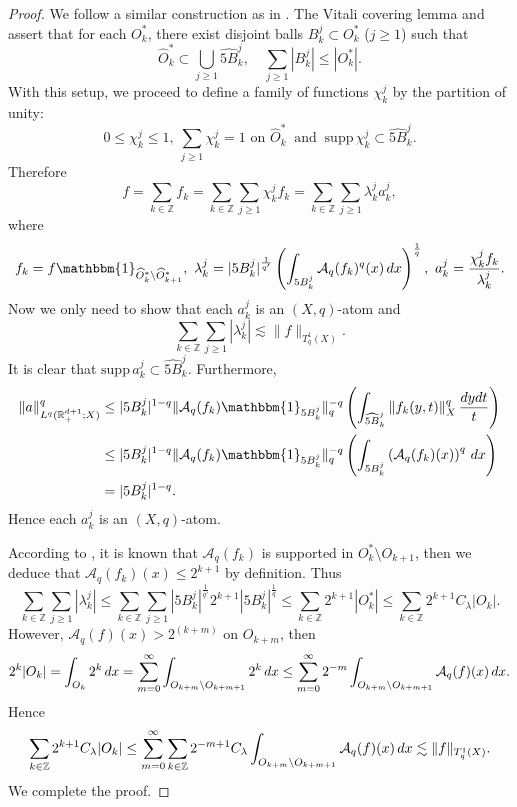 \documentclass[oneside,english,a4wide]{amsart}
\numberwithin{equation}{section}
\numberwithin{figure}{section}
\theoremstyle{plain}
\theoremstyle{plain}
\theoremstyle{definition}
\theoremstyle{plain}
\theoremstyle{remark}
\theoremstyle{definition}
\theoremstyle{remark}
\theoremstyle{definition}
\newcommand{\real}{{\mathbb R}}
\newcommand{\ent}{{\mathbb Z}}
\newcommand{\A}{{\mathcal A}}
\newcommand{\8}{+\infty}
\renewcommand{\1}{\mathbbm{1}}
\newcommand{\wh}{\widehat}
\newcommand\sk[1]{ \left( #1 \right) }
\newcommand\supp{\text{supp}}
\renewcommand\d{{\rm d}}
\begin{document}
{\begin{proof}
We follow a similar construction as in \cite{Kemppainen2014}. The {Vitali covering lemma} and \cite[Lemma 4.2]{Kemppainen2016} assert that for each $O_k^*$, there exist disjoint balls $B_k^j \subset O_k^*$ ($j \geq 1$) such that 
\[
    \wh{O}^*_k \subset \bigcup_{j \geq 1} \wh{5B}_k^j, \quad \sum_{j \geq 1}|B_k^j| \leq |O_k^*|.
\]
With this setup, we proceed to define a family of functions $\chi_k^j$ by the partition of unity:
\[
    0 \leq \chi_k^j \leq 1,\ \sum_{j \geq 1}\chi_k^j = 1 \text{ on } \wh{O}_k^* \ \text{ and } \ \supp\, \chi_k^j \subset \wh{5B}_k^j.
\]
Therefore 
\[
    f =\sum_{k \in \ent} f_k = \sum_{k\in \ent}\sum_{j \geq 1} \chi_{k}^jf_k = \sum_{k\in \ent}\sum_{j \geq 1} \lambda_k^j a_k^j,
\]
where
\begin{equation}\label{Def_f_k}
    f_k = f \1_{\wh{O}^*_k\setminus \wh{O}^*_{k+1} },\ \lambda_k^j = |5B_k^j|^{\frac{1}{q'}}\sk{ \int_{ 5B_k^j } \A_q(f_k)^q(x) \,\d x }^{\frac{1}{q}}, \ a_k^j = \frac{\chi_k^jf_k}{\lambda_k^j}.
\end{equation}
Now we only need to show that each $a_k^j$ is an $(X, q)$-atom and 
\[
    \sum_{k \in \ent} \sum_{j \geq 1}|\lambda_k^j| \lesssim \| f \|_{T^1_q(X)}.
\]
It is clear that $\supp\, a_k^j \subset \wh{5B}_{k}^j $. Furthermore,
\[
\begin{aligned}
    \| a \|_{L^q(\real^{d+1}_+; X)}^q & \leq |5B_k^j|^{1-q}\| \A_q(f_k)\1_{5B_k^j} \|_q^{-q} \sk{\int_{\wh{5B}_k^j} \| f_k(y, t) \|_X^q \,\frac{\d y\d t}{t} } \\ 
    & \leq |5B_k^j|^{1-q}\| \A_q(f_k)\1_{5B_k^j} \|_q^{-q} \sk{\int_{5B_k^j} \sk{\A_q(f_k)(x)}^q \,\d x }\\ & = |5B_k^j|^{1-q}.
\end{aligned}  
\]
Hence each $a_k^j$ is an $(X, q)$-atom. 

According to \cite[Lemma 5]{Coifman1985}, it is known that $\A_q(f_k)$ is supported in $O^*_k \setminus O_{k+1}$, then we deduce that $\A_q(f_k)(x) \leq 2^{k+1}$ by definition. Thus
\[
    \sum_{k \in\ent}\sum_{j \geq 1} |\lambda_k^j| \leq \sum_{k \in\ent}\sum_{j \geq 1} |5B_k^j|^{\frac{1}{q'}} 2^{k+1} |5B_k^j|^{\frac{1}{q}} \leq \sum_{k \in \ent} 2^{k + 1}|O_k^*| \leq \sum_{k \in \ent} 2^{k + 1}C_\lambda|O_k|.
\]
However, $\A_q(f)(x) > 2^{(k+m)}$ on $O_{k+m}$, then
\[
    2^{k}|O_k| = \int_{O_k}2^{k} \,\d x = \sum_{m = 0}^{\infty} \int_{O_{k+m}\setminus O_{k+m+1}} 2^{k}\,\d x \leq \sum_{m = 0}^{\infty} 2^{-m}\int_{O_{k+m}\setminus O_{k+m+1}} \A_q(f)(x)\,\d x.
\]
Hence
\[
    \sum_{k \in \ent} 2^{k + 1}C_\lambda|O_k| \leq \sum_{m = 0}^{\infty}\sum_{k \in \ent} 2^{-m+1}C_\lambda\int_{O_{k+m}\setminus O_{k+m+1}} \A_q(f)(x)\,\d x \lesssim \| f \|_{T^1_q(X)}.
\]
We complete the proof.
\end{proof}

}
\end{document}
